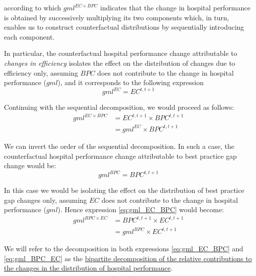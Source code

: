 \documentclass[11pt,a4paper,oneside]{article}
\begin{document}
\noindent according to which $gml^{EC \times BPC}$ indicates that the change in hospital performance is obtained by successively multiplying its two components which, in turn, enables us to construct counterfactual distributions by sequentially introducing each component. 

In particular, the counterfactual hospital performance change attributable to \textsl{changes in efficiency} isolates the effect on the distribution of changes due to efficiency only, assuming $BPC$ does not contribute to the change in hospital performance ($gml$), and it corresponds to the following expression
%
\begin{equation}
 \label{eq:gml_EC}
 gml^{EC}=EC^{t,t+1}
\end{equation}



Continuing with the sequential decomposition, we would proceed as follows:
%
\begin{equation}
\label{eq:gml_EC_BPC}
\begin{array}{cc}
gml^{EC \times BPC} & = EC^{t,t+1} \times BPC^{t,t+1} \\
                     & = gml^{EC} \times BPC^{t,t+1}
\end{array}
\end{equation}



We can invert the order of the sequential decomposition. In such a case, the counterfactual hospital performance change attributable to best practice gap change would be:
%
\begin{equation}
\label{eq:gml_BPC}
 gml^{BPC}=BPC^{t,t+1}
\end{equation}

In this case we would be isolating the effect on the distribution of best practice gap changes only, assuming $EC$ does not contribute to the change in hospital performance ($gml$). Hence expression \eqref{eq:gml_EC_BPC} would become:
%
\begin{equation}
 \label{eq:gml_BPC_EC}
\begin{array}{cc}
 gml^{BPC \times EC} & = BPC^{t,t+1} \times EC^{t,t+1} \\
                     & = gml^{BPC} \times EC^{t,t+1}
\end{array}
\end{equation}


\begin{sloppypar}
We will refer to the decomposition in both expressions \eqref{eq:gml_EC_BPC} and \eqref{eq:gml_BPC_EC} as the \ul{bipartite decomposition of the relative contributions to the changes in the distribution of hospital performance}. 
\end{sloppypar}
\end{document}

